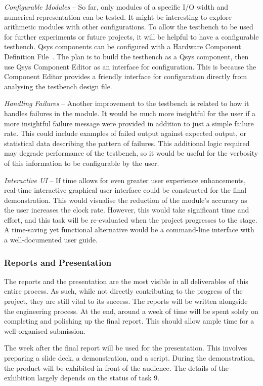 \textit{Configurable Modules} --
So far, only modules of a specific I/O width and numerical representation can
be tested.
It might be interesting to explore arithmetic modules with other configurations.
To allow the testbench to be used for further experiments or future projects,
it will be helpful to have a configurable testbench.
Qsys components can be configured with a Hardware Component Definition
File~\cite{Altera5}.
The plan is to build the testbench as a Qsys component, then use Qsys Component
Editor as an interface for configuration.
This is because the Component Editor provides a friendly interface for
configuration directly from analysing the testbench design file.

\textit{Handling Failures} --
Another improvement to the testbench is related to how it handles failures
in the module.
It would be much more insightful for the user if a more insightful failure
message were provided in addition to just a simple failure rate.
This could include examples of failed output against expected output,
or statistical data describing the pattern of failures.
This additional logic required may degrade performance of the testbench,
so it would be useful for the verbosity of this information to be configurable
by the user.

\textit{Interactive UI} --
If time allows for even greater user experience enhancements, real-time
interactive graphical user interface could be constructed for the final
demonstration.
This would visualise the reduction of the module's accuracy as the user
increases the clock rate.
However, this would take significant time and effort, and this task will
be re-evaluated when the project progresses to the stage.
A time-saving yet functional alternative would be a command-line interface
with a well-documented user guide.

\subsubsection{Reports and Presentation}
The reports and the presentation are the most visible in all deliverables of
this entire process.
As such, while not directly contributing to the progress of the project,
they are still vital to its success.
The reports will be written alongside the engineering process.
At the end, around a week of time will be spent solely on completing and
polishing up the final report.
This should allow ample time for a well-organised submission.

The week after the final report will be used for the presentation.
This involves preparing a slide deck, a demonstration, and a script.
During the demonstration, the product will be exhibited in front of the
audience.
The details of the exhibition largely depends on the status of task 9.

